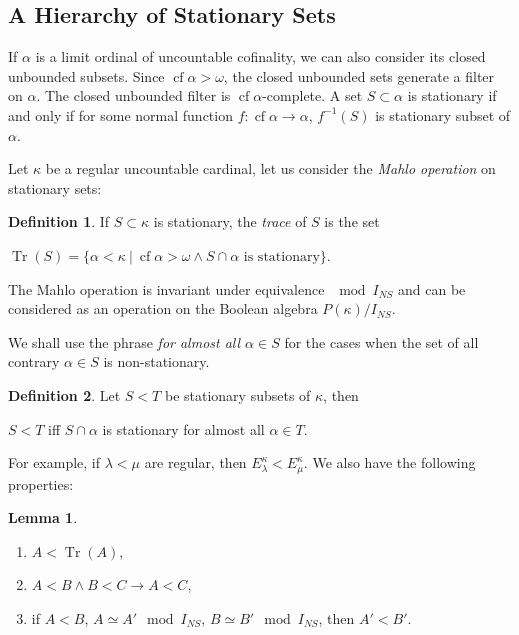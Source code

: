 \documentclass[8pt]{article}
\theoremstyle{definition}
\newtheorem{definition}{Definition}[section]
\theoremstyle{definition}
\theoremstyle{definition}
\theoremstyle{definition}
\theoremstyle{definition}
\theoremstyle{definition}
\theoremstyle{definition}
\theoremstyle{definition}
\newtheorem{lemma}{Lemma}[section]
\theoremstyle{definition}
\theoremstyle{definition}
\theoremstyle{definition}
\theoremstyle{definition}
\theoremstyle{definition}
\theoremstyle{definition}
\theoremstyle{question}
\begin{document}
\subsection{A Hierarchy of Stationary Sets}

If $\alpha$ is a limit ordinal of uncountable cofinality, we can also consider its closed unbounded subsets.
Since $\operatorname{cf} \alpha > \omega$, the closed unbounded sets generate a filter on $\alpha$.
The closed unbounded filter is $\operatorname{cf}\alpha$-complete. A set $S \subset \alpha$ is stationary if and
only if for some normal function $f : \operatorname{cf} \alpha \to \alpha$, $f^{-1}(S)$ is stationary subset of $\alpha$.

Let $\kappa$ be a regular uncountable cardinal, let us consider the \emph{Mahlo operation} on stationary sets:
\begin{definition}
  If $S \subset \kappa$ is stationary, the \emph{trace} of $S$ is the set
  \begin{center}
    $\operatorname{Tr}(S) = \{ \alpha < \kappa \: | \: \operatorname{cf} \alpha > \omega \land \text{$S \cap \alpha$ is stationary} \}$.
  \end{center}
\end{definition}

The Mahlo operation is invariant under equivalence $\mod I_{NS}$ and can be considered as an operation
on the Boolean algebra $P(\kappa) / I_{NS}$. 

We shall use the phrase \emph{for almost all $\alpha \in S$} for the cases when the set of all contrary $\alpha \in S$
is non-stationary.

\begin{definition}
  Let $S < T$ be stationary subsets of $\kappa$, then
  \begin{center}
    $S < T$ iff $S \cap \alpha$ is stationary for almost all $\alpha \in T$.
  \end{center}
\end{definition}

For example, if $\lambda < \mu$ are regular, then $E^{\kappa}_{\lambda} < E^{\kappa}_{\mu}$.
We also have the following properties:
\begin{lemma}
  $ $

  \begin{enumerate}
    \item $A < \operatorname{Tr}(A)$,
    \item $A < B \land B < C \to A < C$,
    \item if $A < B$, $A \simeq A' \mod I_{NS}$, $B \simeq B' \mod I_{NS}$, then $A' < B'$.
  \end{enumerate}
\end{lemma}
\end{document}
